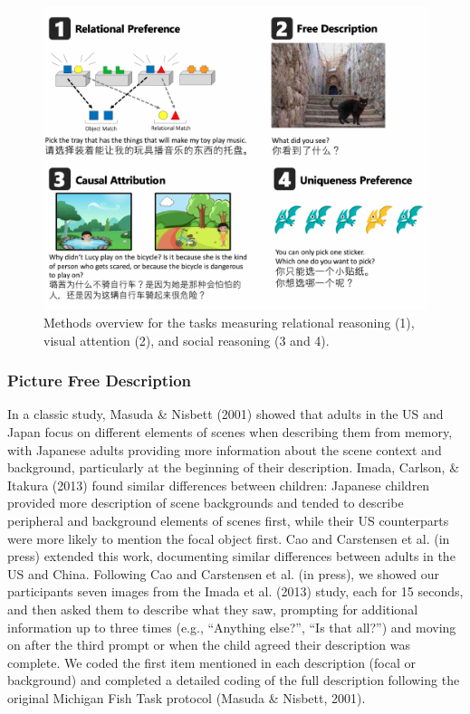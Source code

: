 \documentclass[10pt, letterpaper]{article}
\newenvironment{CodeChunk}{}{}
\begin{document}
\begin{CodeChunk}
\begin{figure}[H]

{\centering \includegraphics{figs/image-1} 

}

\caption[Methods overview for the tasks measuring relational reasoning (1), visual attention (2), and social reasoning (3 and 4)]{Methods overview for the tasks measuring relational reasoning (1), visual attention (2), and social reasoning (3 and 4).}\label{fig:image}
\end{figure}
\end{CodeChunk}

\hypertarget{picture-free-description}{%
\subsubsection{Picture Free
Description}\label{picture-free-description}}

In a classic study, Masuda \& Nisbett (2001) showed that adults in the
US and Japan focus on different elements of scenes when describing them
from memory, with Japanese adults providing more information about the
scene context and background, particularly at the beginning of their
description. Imada, Carlson, \& Itakura (2013) found similar differences
between children: Japanese children provided more description of scene
backgrounds and tended to describe peripheral and background elements of
scenes first, while their US counterparts were more likely to mention
the focal object first. Cao and Carstensen et al. (in press) extended
this work, documenting similar differences between adults in the US and
China. Following Cao and Carstensen et al. (in press), we showed our
participants seven images from the Imada et al. (2013) study, each for
15 seconds, and then asked them to describe what they saw, prompting for
additional information up to three times (e.g., ``Anything else?'', ``Is
that all?'') and moving on after the third prompt or when the child
agreed their description was complete. We coded the first item mentioned
in each description (focal or background) and completed a detailed
coding of the full description following the original Michigan Fish Task
protocol (Masuda \& Nisbett, 2001).
\end{document}
